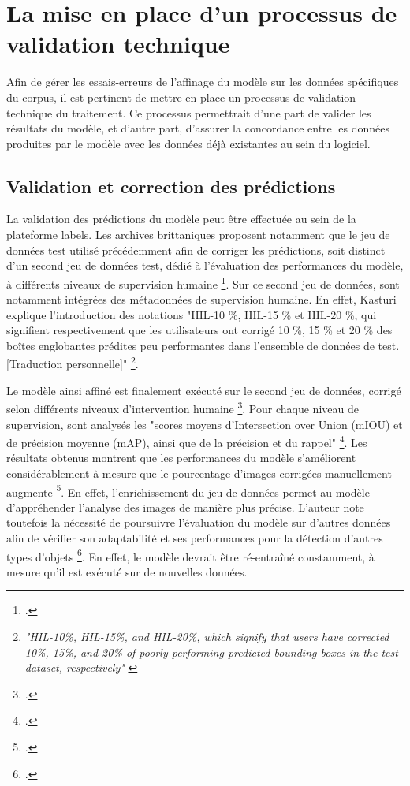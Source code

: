 \section{\label{II_2_C}La mise en place d'un processus de validation technique}


Afin de gérer les essais-erreurs de l'affinage du modèle sur les données spécifiques du corpus, il est pertinent de mettre en place un processus de validation technique du traitement. Ce processus permettrait d'une part de valider les résultats du modèle, et d’autre part, d'assurer la concordance entre les données produites par le modèle avec les données déjà existantes au sein du logiciel.

\subsection{Validation et correction des prédictions}

La validation des prédictions du modèle peut être effectuée au sein de la plateforme \gls{labels}. Les archives brittaniques proposent notamment que le jeu de données test utilisé précédemment afin de corriger les prédictions, soit distinct d'un second jeu de données test, dédié à l'évaluation des performances du modèle, à différents niveaux de supervision humaine \footcite{kasturi2024}. Sur ce second jeu de données, sont notamment intégrées des métadonnées de supervision humaine. En effet, Kasturi explique l'introduction des notations "HIL-10 \%, HIL-15 \% et HIL-20 \%, qui signifient respectivement que les utilisateurs ont corrigé 10 \%, 15 \% et 20 \% des boîtes englobantes prédites peu performantes dans l’ensemble de données de test. [Traduction personnelle]" \footnote{\textit{"HIL-10\%, HIL-15\%, and HIL-20\%, which signify that users have corrected 10\%, 15\%, and 20\% of poorly performing predicted bounding boxes in the test dataset, respectively"} \cite{kasturi2024}}.

Le modèle ainsi affiné est finalement exécuté sur le second jeu de données, corrigé selon différents niveaux d'intervention humaine \footcite{kasturi2024}. Pour chaque niveau de supervision, sont analysés les "scores moyens d’Intersection over Union (mIOU) et de précision moyenne (mAP), ainsi que de la précision et du rappel" \footcite{kasturi2024}. 
Les résultats obtenus montrent que les performances du modèle s'améliorent considérablement à mesure que le pourcentage d'images corrigées manuellement augmente \footcite{kasturi2024}. En effet, l'enrichissement du jeu de données permet au modèle d'appréhender l'analyse des images de manière plus précise. L'auteur note toutefois la nécessité de poursuivre l'évaluation du modèle sur d'autres données afin de vérifier son adaptabilité et ses performances pour la détection d'autres types d'objets \footcite{kasturi2024}. En effet, le modèle devrait être ré-entraîné constamment, à mesure qu'il est exécuté sur de nouvelles données.

